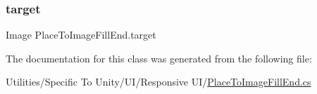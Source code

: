 \subsubsection{\texorpdfstring{target}{target}}
{\footnotesize\ttfamily Image Place\+To\+Image\+Fill\+End.\+target}



The documentation for this class was generated from the following file\+:\begin{DoxyCompactItemize}
\item 
Utilities/\+Specific To Unity/\+U\+I/\+Responsive U\+I/\hyperlink{_place_to_image_fill_end_8cs}{Place\+To\+Image\+Fill\+End.\+cs}\end{DoxyCompactItemize}
